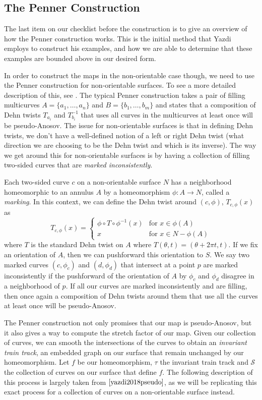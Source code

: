 \subsection{The Penner Construction}

The last item on our checklist before the construction is to give an overview of how the Penner construction works. This is the initial method that Yazdi employs to construct his examples, and how we are able to determine that these examples are bounded above in our desired form.

In order to construct the maps in the non-orientable case though, we need to use the Penner
construction for non-orientable surfaces. To see a more detailed description of this, see
\cite{Strenner_2017}. The typical Penner construction takes a pair of filling multicurves
$A = \{a_1,\dots,a_n\}$ and $B = \{b_1,\dots,b_m\}$ and states that a composition of Dehn twists
$T_{a_i}$ and $T_{b_i}^{-1}$ that uses all curves in the multicurves at least once will be
pseudo-Anosov. The issue for non-orientable surfaces is that in defining Dehn twists, we don't have
a well-defined notion of a left or right Dehn twist (what direction we are choosing to be the Dehn
twist and which is its inverse). The way we get around this for non-orientable surfaces is by having
a collection of filling two-sided curves that are \textit{marked inconsistently}.

Each two-sided curve $c$ on a non-orientable surface $N$ has a neighborhood homeomorphic to an annulus $A$ by a homeomorphism $\phi: A \xrightarrow{} N$, called a \textit{marking}. In this context, we can define the Dehn twist around $(c,\phi)$, $T_{c,\phi}(x)$ as $$T_{c,\phi}(x) = \begin{cases} \phi \circ T \circ \phi^{-1}(x) & \text{for } x \in \phi(A) \\ x & \text{for } x \in N - \phi(A) \end{cases}$$ where $T$ is the standard Dehn twist on $A$ where $T(\theta,t) = (\theta + 2\pi t,t)$. If we fix an orientation of $A$, then we can pushforward this orientation to $S$. We say two marked curves $(c,\phi_c)$ and $(d,\phi_d)$ that intersect at a point $p$ are marked inconsistently if the pushforward of the orientation of $A$ by $\phi_c$ and $\phi_d$ disagree in a neighborhood of $p$.  If all our curves are marked inconsistently and are filling, then once again a composition of Dehn twists around them that use all the curves at least once will be pseudo-Anosov.

The Penner construction \cite{penner1988construction} not only promises that our map is pseudo-Anosov, but it also gives a way to compute the stretch factor of our map. Given our collection of curves, we can smooth the intersections of the curves to obtain an \textit{invariant train track}, an embedded graph on our surface that remain unchanged by our homeomorphism. Let $f$ be our homeomorphism, $\tau$ the invariant train track and $\mathcal{S}$ the collection of curves on our surface that define $f$. The following description of this process is largely taken from $\cite{yazdi2018pseudo}$, as we will be replicating this exact process for a collection of curves on a non-orientable surface instead.

